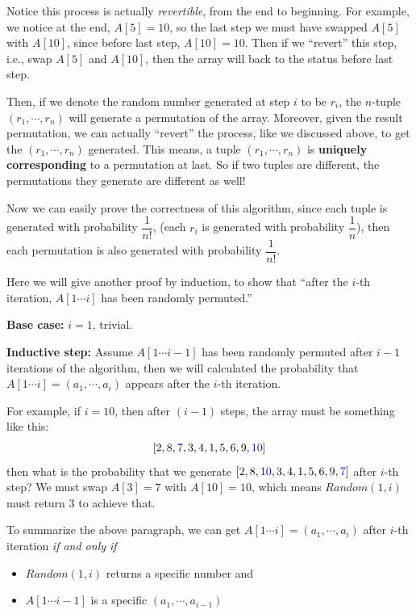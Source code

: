 \documentclass[11pt, a4paper]{COMP3711}
\begin{document}
\begin{spacing}{1.5}
    Notice this process is actually {\it revertible}, 
    from the end to beginning. For example, we notice at the end, 
    $A[5]=10$, so the last step we must have swapped $A[5]$ with 
    $A[10]$, since before last step, $A[10]=10$. Then if we 
    ``revert'' this step, i.e., swap $A[5]$ and $A[10]$, then 
    the array will back to the status before last step.

    Then, if we denote the random number generated at step $i$
    to be $r_i$, the $n$-tuple $(r_1,\cdots, r_n)$ will 
    generate a permutation of the array. Moreover, given the 
    result permutation, we can actually ``revert'' the process, 
    like we discussed above, to get the $(r_1,\cdots,r_n)$ 
    generated. This means, a tuple $(r_1,\cdots, r_n)$ is 
    {\bf uniquely corresponding} to a permutation at last.
    So if two tuples are different, the permutations they 
    generate are different as well!

    Now we can easily prove the correctness of this algorithm, 
    since each tuple is generated with probability $\dfrac{1}{n!}$,
    (each $r_i$ is generated with probability $\dfrac{1}{n}$),
    then each permutation is also generated with probability 
    $\dfrac{1}{n!}$.

    \vspace{0.3in}

    Here we will give another proof by induction, to show 
    that ``after the $i$-th iteration, $A[1\cdots i]$
    has been randomly permuted.''

    {\bf Base case: }$i=1$, trivial.

    {\bf Inductive step:} Assume $A[1\cdots i-1]$ has been randomly 
    permuted after $i-1$ iterations of the algorithm, then 
    we will calculated the probability that $A[1\cdots i]=
    (a_1,\cdots,a_i)$ appears after the $i$-th iteration.

    For example, if $i=10$, then after $(i-1)$ steps, 
    the array must be something like this: 
    $$[2,8,{\color{blue} 7},3,4,1,5,6,9,{\color{blue} 10}]$$
    then what is the probability that we generate 
    $[2,8,{\color{blue} 10},3,4,1,5,6,9,{\color{blue} 7}]$ after $i$-th step? 
    We must swap $A[3]=7$ with $A[10]=10$, which means 
    $Random(1, i)$ must return 3 to achieve that.

    To summarize the above paragraph, we can get 
    $A[1\cdots i]=(a_1,\cdots,a_i)$ after $i$-th iteration 
    {\it if and only if}
    \begin{itemize}
        \item $Random(1,i)$ returns a specific number and 
        \item $A[1\cdots i-1]$ is a specific $(a_1,\cdots,a_{i-1})$
    \end{itemize}


\end{spacing}
\end{document}
